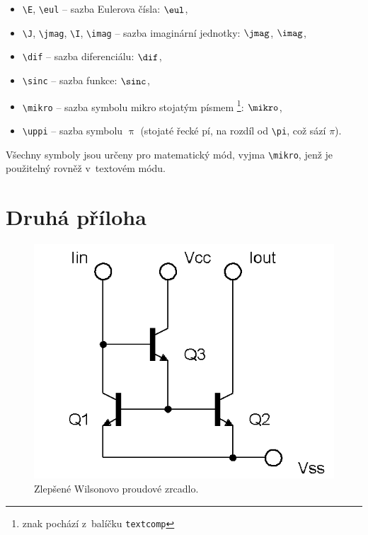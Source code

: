 \begin{itemize}
  \item
    \verb|\E|, \verb|\eul| -- sazba Eulerova čísla: $\eul$,
  \item
    \verb|\J|, \verb|\jmag|, \verb|\I|, \verb|\imag| -- sazba imaginární jednotky: $\jmag$, $\imag$,
  \item
    \verb|\dif| -- sazba diferenciálu: $\dif$,
  \item
    \verb|\sinc| -- sazba funkce: $\sinc$,
  \item
    \verb|\mikro| -- sazba symbolu mikro stojatým písmem%
			\footnote{znak pochází z~balíčku \texttt{textcomp}}: $\mikro$,
	\item
		\verb|\uppi| -- sazba symbolu $\uppi$
			(stojaté řecké pí, na rozdíl od \verb|\pi|, což sází $\pi$).
\end{itemize}
%
Všechny symboly jsou určeny pro matematický mód, vyjma \verb|\mikro|, jenž je\\ použitelný rovněž v~textovém módu.


\chapter{Druhá příloha}

\begin{figure}[!h]
  \begin{center}
    \includegraphics[scale=0.5]{obrazky/ZlepseneWilsonovoZrcadloNPN}
  \end{center}
  \caption[Alenčino zrcadlo]{Zlepšené Wilsonovo proudové zrcadlo.}
\end{figure}

